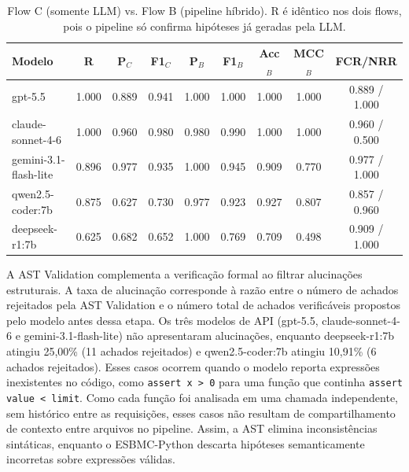 \documentclass[sigconf]{acmart}
\begin{document}
\begin{table}[htb]
\caption{Flow C (somente LLM) vs. Flow B (pipeline híbrido). R é idêntico nos dois flows, pois o pipeline só confirma hipóteses já geradas pela LLM.}
\label{tab:results}
\centering
\scriptsize
\begin{tabular}{lcccccccc}
\toprule
Modelo & R & P$_C$ & F1$_C$ & P$_B$ & F1$_B$ & Acc$_B$ & MCC$_B$ & FCR/NRR \\
\midrule
gpt-5.5 & 1.000 & 0.889 & 0.941 & 1.000 & 1.000 & 1.000 & 1.000 & 0.889 / 1.000 \\
claude-sonnet-4-6 & 1.000 & 0.960 & 0.980 & 0.980 & 0.990 & 1.000 & 1.000 & 0.960 / 0.500 \\
gemini-3.1-flash-lite & 0.896 & 0.977 & 0.935 & 1.000 & 0.945 & 0.909 & 0.770 & 0.977 / 1.000 \\
qwen2.5-coder:7b & 0.875 & 0.627 & 0.730 & 0.977 & 0.923 & 0.927 & 0.807 & 0.857 / 0.960 \\
deepseek-r1:7b & 0.625 & 0.682 & 0.652 & 1.000 & 0.769 & 0.709 & 0.498 & 0.909 / 1.000 \\
\bottomrule
\end{tabular}
\end{table}

A AST Validation complementa a verificação formal ao filtrar alucinações estruturais. A taxa de alucinação corresponde à razão entre o número de achados rejeitados pela AST Validation e o número total de achados verificáveis propostos pelo modelo antes dessa etapa. Os três modelos de API (gpt-5.5, claude-sonnet-4-6 e gemini-3.1-flash-lite) não apresentaram alucinações, enquanto deepseek-r1:7b atingiu 25,00\% (11 achados rejeitados) e qwen2.5-coder:7b atingiu 10,91\% (6 achados rejeitados). Esses casos ocorrem quando o modelo reporta expressões inexistentes no código, como \texttt{assert x > 0} para uma função que continha \texttt{assert value < limit}. Como cada função foi analisada em uma chamada independente, sem histórico entre as requisições, esses casos não resultam de compartilhamento de contexto entre arquivos no pipeline. Assim, a AST elimina inconsistências sintáticas, enquanto o ESBMC-Python descarta hipóteses semanticamente incorretas sobre expressões válidas.
\end{document}
